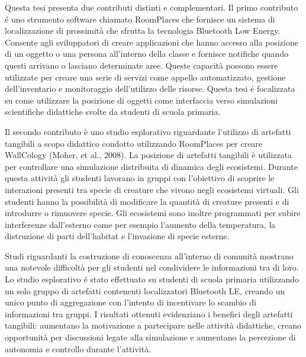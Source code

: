 \abstract

\label{chap:abstract_italiano}

Questa tesi presenta due contributi distinti e complementari. Il primo contributo é uno strumento software chiamato RoomPlaces che fornisce un sistema di localizzazione di prossimità che sfrutta la tecnologia Bluetooth Low Energy. Consente agli sviluppatori di creare applicazioni che hanno accesso alla posizione di un oggetto o una persona all’interno della classe e fornisce notifiche quando questi arrivano o lasciano determinate aree. Queste capacità possono essere utilizzate per creare una serie di servizi come appello automatizzato, gestione dell’inventario e monitoraggio dell’utilizzo delle risorse. Questa tesi é focalizzata su come utilizzare la posizione di oggetti come interfaccia verso simulazioni scientifiche didattiche svolte da studenti di scuola primaria.  

Il secondo contributo è uno studio esplorativo riguardante l’utilizzo di artefatti tangibili a scopo didattico condotto utilizzando RoomPlaces per creare WallCology (Moher, et al., 2008). La posizione di artefatti tangibili è utilizzata per controllare una simulazione distribuita di dinamica degli ecosistemi. Durante questa attività gli studenti lavorano in gruppi con l’obiettivo di scoprire le interazioni presenti tra specie di creature che vivono negli ecosistemi virtuali. Gli studenti hanno la possibilità di modificare la quantità di creature presenti e di introdurre o rimuovere specie. Gli ecosistemi sono inoltre programmati per subire interferenze dall’esterno come per esempio l’aumento della temperatura, la distruzione di parti dell’habitat e l’invasione di specie esterne.

Studi riguardanti la costruzione di conoscenza all’interno di comunità mostrano una notevole difficoltà per gli studenti nel condividere le informazioni tra di loro. Lo studio esplorativo é stato effettuato su studenti di scuola primaria utilizzando un solo gruppo di artefatti contenenti localizzatori Bluetooth LE, creando un unico punto di aggregazione con l’intento di incentivare lo scambio di informazioni tra gruppi. I risultati ottenuti evidenziano i benefici degli artefatti tangibili: aumentano la motivazione a partecipare nelle attività didattiche, creano opportunità per discussioni legate alla simulazione e aumentano la percezione di autonomia e controllo durante l’attività.
